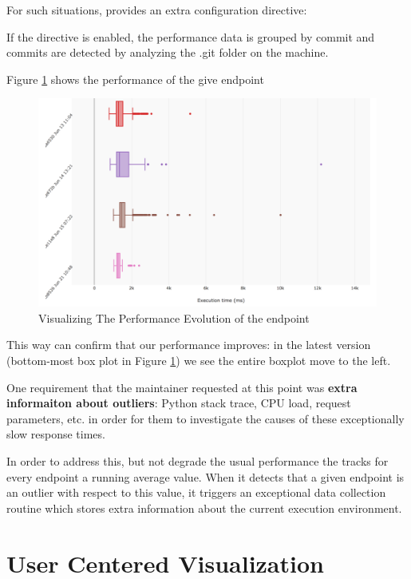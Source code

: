 \documentclass[conference]{IEEEtran}
\begin{document}
  For such situations, \tool provides an extra configuration directive:


  If the directive is enabled, the performance data is grouped by commit and commits are detected by analyzing the .git folder on the machine. 

  Figure \ref{fig:tee} shows the performance of the give endpoint 

  \begin{figure}[h!]
    \centering
    \includegraphics[width=\linewidth]{translation_endpoint_evolution.png}
    \caption{Visualizing The Performance Evolution of the \epTranslations endpoint}
    \label{fig:tee}
  \end{figure}

  This way can confirm that our performance improves: in the latest version (bottom-most box plot in Figure \ref{fig:tee}) we see the entire boxplot move to the left. 


  \niceseparator


  One requirement that the maintainer requested at this point was {\bf extra informaiton about outliers}: Python stack trace, CPU load, request parameters, etc. in order for them to investigate the causes of these exceptionally slow response times. 

  In order to address this, but not degrade the usual performance the \tool tracks for every endpoint a running average value. When it detects that a given endpoint is an outlier with respect to this value, it triggers an exceptional data collection routine which stores extra information about the current execution environment. 


\section {User Centered Visualization}
\end{document}
